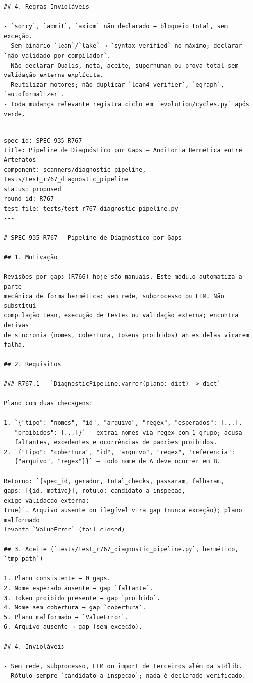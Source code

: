 \documentclass[12pt,openany,oneside,a4paper,brazil,chapter=TITLE]{abntex2}
\begin{document}
\begin{lstlisting}
## 4. Regras Invioláveis

- `sorry`, `admit`, `axiom` não declarado → bloqueio total, sem exceção.
- Sem binário `lean`/`lake` → `syntax_verified` no máximo; declarar `não validado por compilador`.
- Não declarar Qualis, nota, aceite, superhuman ou prova total sem validação externa explícita.
- Reutilizar motores; não duplicar `lean4_verifier`, `egraph`, `autoformalizer`.
- Toda mudança relevante registra ciclo em `evolution/cycles.py` após verde.
\end{lstlisting}


\begin{lstlisting}
---
spec_id: SPEC-935-R767
title: Pipeline de Diagnóstico por Gaps — Auditoria Hermética entre Artefatos
component: scanners/diagnostic_pipeline, tests/test_r767_diagnostic_pipeline
status: proposed
round_id: R767
test_file: tests/test_r767_diagnostic_pipeline.py
---

# SPEC-935-R767 — Pipeline de Diagnóstico por Gaps

## 1. Motivação

Revisões por gaps (R766) hoje são manuais. Este módulo automatiza a parte
mecânica de forma hermética: sem rede, subprocesso ou LLM. Não substitui
compilação Lean, execução de testes ou validação externa; encontra derivas
de sincronia (nomes, cobertura, tokens proibidos) antes delas virarem falha.

## 2. Requisitos

### R767.1 — `DiagnosticPipeline.varrer(plano: dict) -> dict`

Plano com duas checagens:

1. `{"tipo": "nomes", "id", "arquivo", "regex", "esperados": [...],
   "proibidos": [...]}` — extrai nomes via regex com 1 grupo; acusa
   faltantes, excedentes e ocorrências de padrões proibidos.
2. `{"tipo": "cobertura", "id", "arquivo", "regex", "referencia":
   {"arquivo", "regex"}}` — todo nome de A deve ocorrer em B.

Retorno: `{spec_id, gerador, total_checks, passaram, falharam,
gaps: [{id, motivo}], rotulo: candidato_a_inspecao, exige_validacao_externa:
True}`. Arquivo ausente ou ilegível vira gap (nunca exceção); plano malformado
levanta `ValueError` (fail-closed).

## 3. Aceite (`tests/test_r767_diagnostic_pipeline.py`, hermético, `tmp_path`)

1. Plano consistente → 0 gaps.
2. Nome esperado ausente → gap `faltante`.
3. Token proibido presente → gap `proibido`.
4. Nome sem cobertura → gap `cobertura`.
5. Plano malformado → `ValueError`.
6. Arquivo ausente → gap (sem exceção).

## 4. Invioláveis

- Sem rede, subprocesso, LLM ou import de terceiros além da stdlib.
- Rótulo sempre `candidato_a_inspecao`; nada é declarado verificado.
\end{lstlisting}


\end{document}
